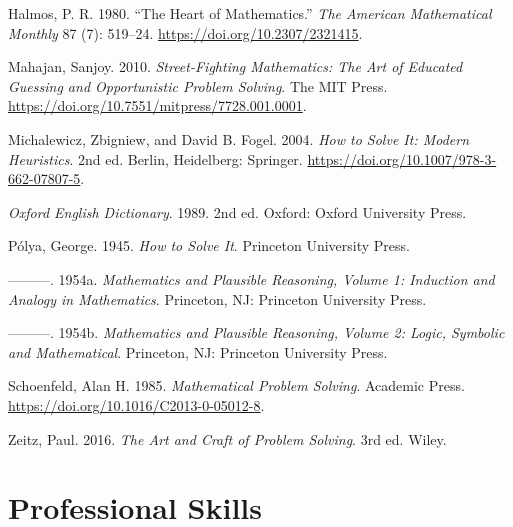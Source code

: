 \documentclass[
  a4paper,
  DIV=11,
  numbers=noendperiod,
  oneside]{scrreprt}
\newlength{\cslhangindent}
\newenvironment{CSLReferences}[2] %
 {\begin{list}{}{%
  \setlength{\itemindent}{0pt}
  \setlength{\leftmargin}{0pt}
  \setlength{\parsep}{0pt}
  \ifodd #1
   \setlength{\leftmargin}{\cslhangindent}
   \setlength{\itemindent}{-1\cslhangindent}
  \fi
  \setlength{\itemsep}{#2\baselineskip}}}
 {\end{list}}
\begin{document}
\label{refs}
\begin{CSLReferences}{1}{0}
Halmos, P. R. 1980. {``The Heart of Mathematics.''} \emph{The American
Mathematical Monthly} 87 (7): 519--24.
\url{https://doi.org/10.2307/2321415}.

Mahajan, Sanjoy. 2010. \emph{Street-Fighting Mathematics: The Art of
Educated Guessing and Opportunistic Problem Solving}. The MIT Press.
\url{https://doi.org/10.7551/mitpress/7728.001.0001}.

Michalewicz, Zbigniew, and David B. Fogel. 2004. \emph{{How to Solve It:
Modern Heuristics}}. 2nd ed. Berlin, Heidelberg: Springer.
\url{https://doi.org/10.1007/978-3-662-07807-5}.

\emph{Oxford English Dictionary}. 1989. 2nd ed. Oxford: Oxford
University Press.

Pólya, George. 1945. \emph{{How to Solve It}}. Princeton University
Press.

---------. 1954a. \emph{Mathematics and Plausible Reasoning, Volume 1:
Induction and Analogy in Mathematics}. Princeton, NJ: Princeton
University Press.

---------. 1954b. \emph{Mathematics and Plausible Reasoning, Volume 2:
Logic, Symbolic and Mathematical}. Princeton, NJ: Princeton University
Press.

Schoenfeld, Alan H. 1985. \emph{Mathematical Problem Solving}. Academic
Press. \url{https://doi.org/10.1016/C2013-0-05012-8}.

Zeitz, Paul. 2016. \emph{The Art and Craft of Problem Solving}. 3rd ed.
Wiley.

\end{CSLReferences}

\endgroup

\part{Professional Skills}
\end{document}
